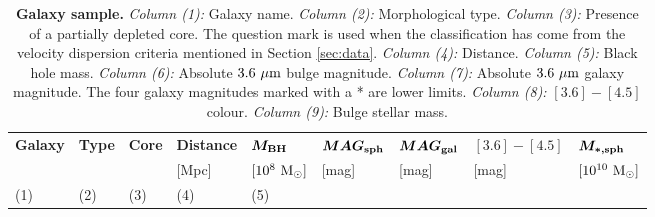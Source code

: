 \begin{table*}                                        
\small                                                
\begin{center}                                        
\caption{{\bf Galaxy sample.}                        
\emph{Column (1):} Galaxy name.                       
\emph{Column (2):} Morphological type.                       
\emph{Column (3):} Presence of a partially depleted core. 			The question mark is used when the classification has come from the velocity dispersion criteria mentioned in Section \ref{sec:data}.   
\emph{Column (4):} Distance.                                   
\emph{Column (5):} Black hole mass.                                   
\emph{Column (6):} Absolute $3.6\rm~\mu m$ bulge magnitude.                                   
\emph{Column (7):} Absolute $3.6\rm~\mu m$ galaxy magnitude. 			The four galaxy magnitudes marked with a * are lower limits.                                   
\emph{Column (8):} $[3.6]-[4.5]$ colour.                                   
\emph{Column (9):} Bulge stellar mass. }                      
\begin{tabular}{lllllllll}                           
\hline                                                
\multicolumn{1}{l}{{\bf Galaxy}} &                   
\multicolumn{1}{l}{{\bf Type}} &                     
\multicolumn{1}{l}{{\bf Core}} &                     
\multicolumn{1}{l}{{\bf Distance}} &                 
\multicolumn{1}{l}{{\bf $\bm{M_{\rm BH}}$}} &  
\multicolumn{1}{l}{{\bf $\bm{MAG_{\rm sph}}$}} &  
\multicolumn{1}{l}{{\bf $\bm{MAG_{\rm gal}}$}} &  
\multicolumn{1}{l}{{\bf $\bm{[3.6]-[4.5]}$}} &  
\multicolumn{1}{l}{{\bf $\bm{M_{\rm *,sph}}$}} \\  
\multicolumn{1}{l}{} &                                
\multicolumn{1}{l}{} &                                
\multicolumn{1}{l}{} &                                
\multicolumn{1}{l}{[Mpc]} &                           
\multicolumn{1}{l}{$[10^8~\rm M_{\odot}]$} &         
\multicolumn{1}{l}{[mag]} &                                
\multicolumn{1}{l}{[mag]} &                                
\multicolumn{1}{l}{[mag]} &                                
\multicolumn{1}{l}{$[10^{10}~\rm M_{\odot}]$} \\                             
\multicolumn{1}{l}{(1)} &                             
\multicolumn{1}{l}{(2)} &                             
\multicolumn{1}{l}{(3)} &                             
\multicolumn{1}{l}{(4)} &                             
\multicolumn{1}{l}{(5)} &                             

\end{tabular}
\end{center}
\end{table*}
